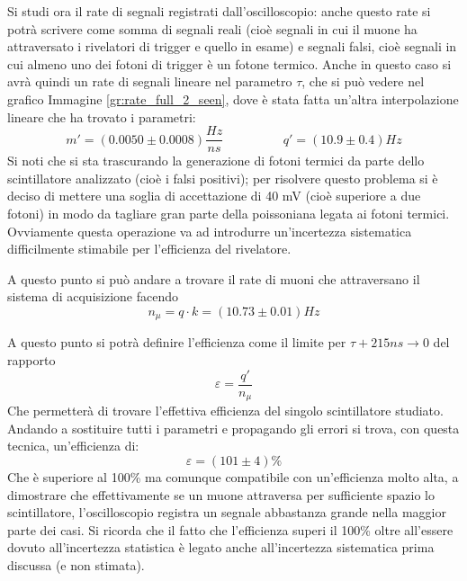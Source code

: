 Si studi ora il rate di segnali registrati dall'oscilloscopio: anche questo rate si potrà scrivere come somma di segnali reali (cioè segnali in cui il muone ha attraversato i rivelatori di trigger e quello in esame) e segnali falsi, cioè segnali in cui almeno uno dei fotoni di trigger è un fotone termico. Anche in questo caso si avrà quindi un rate di segnali lineare nel parametro $\tau$, che si può vedere nel grafico Immagine \ref{gr:rate_full_2_seen}, dove è stata fatta un'altra interpolazione lineare che ha trovato i parametri:
\begin{equation}
  m' = (0.0050 \pm 0.0008) \frac{Hz}{ns} \hspace{2cm} q' = (10.9 \pm 0.4) Hz
\end{equation}
Si noti che si sta trascurando la generazione di fotoni termici da parte dello scintillatore analizzato (cioè i falsi positivi); per risolvere questo problema si è deciso di mettere una soglia di accettazione di 40 mV (cioè superiore a due fotoni) in modo da tagliare gran parte della poissoniana legata ai fotoni termici. Ovviamente questa operazione va ad introdurre un'incertezza sistematica difficilmente stimabile per l'efficienza del rivelatore.\\

A questo punto si può andare a trovare il rate di muoni che attraversano il sistema di acquisizione facendo
\begin{equation}
  n_\mu = q \cdot k = (10.73 \pm 0.01) Hz
\end{equation}

A questo punto si potrà definire l'efficienza come il limite per $\tau + 215 ns \to 0$ del rapporto
$$\varepsilon = \frac{q'}{n_\mu}$$
Che permetterà di trovare l'effettiva efficienza del singolo scintillatore studiato. Andando a sostituire tutti i parametri e propagando gli errori si trova, con questa tecnica, un'efficienza di:
\begin{equation}
  \varepsilon = (101 \pm 4)\%
\end{equation}
Che è superiore al 100\% ma comunque compatibile con un'efficienza molto alta, a dimostrare che effettivamente se un muone attraversa per sufficiente spazio lo scintillatore, l'oscilloscopio registra un segnale abbastanza grande nella maggior parte dei casi. Si ricorda che il fatto che l'efficienza superi il 100\% oltre all'essere dovuto all'incertezza statistica \`e legato anche all'incertezza sistematica prima discussa (e non stimata).\\


